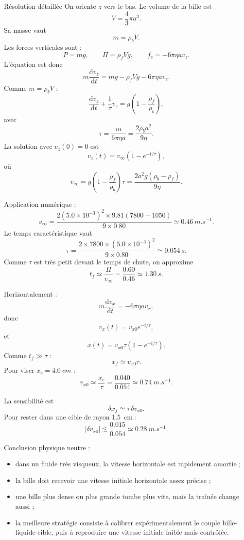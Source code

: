 \documentclass[11pt,a4paper]{article}
\newcommand{\der}[2]{\frac{\mathrm{d}#1}{\mathrm{d}#2}}
\begin{document}
\begin{correctionbox}{Résolution détaillée}{}
On oriente $z$ vers le bas. Le volume de la bille est
\[
V=\frac43\pi a^3.
\]
Sa masse vaut
\[
m=\rho_b V.
\]
Les forces verticales sont :
\[
P=mg,\qquad
\Pi=\rho_f Vg,\qquad
f_z=-6\pi\eta a v_z.
\]
L'équation est donc
\[
m\der{v_z}{t}=mg-\rho_fVg-6\pi\eta a v_z.
\]
Comme $m=\rho_bV$ :
\[
\der{v_z}{t}+\frac{1}{\tau}v_z
=
g\left(1-\frac{\rho_f}{\rho_b}\right),
\]
avec
\[
\tau=\frac{m}{6\pi\eta a}
=\frac{2\rho_ba^2}{9\eta}.
\]
La solution avec $v_z(0)=0$ est
\[
v_z(t)=v_\infty(1-e^{-t/\tau}),
\]
où
\[
v_\infty
=
g\left(1-\frac{\rho_f}{\rho_b}\right)\tau
=
\frac{2a^2g(\rho_b-\rho_f)}{9\eta}.
\]

Application numérique :
\[
v_\infty
=
\frac{2(5.0\times10^{-3})^2\times9.81(7800-1050)}
{9\times0.80}
\simeq \SI{0.46}{m.s^{-1}}.
\]
Le temps caractéristique vaut
\[
\tau=\frac{2\times7800\times(5.0\times10^{-3})^2}{9\times0.80}
\simeq \SI{0.054}{s}.
\]
Comme $\tau$ est très petit devant le temps de chute, on approxime
\[
t_f\simeq \frac{H}{v_\infty}
=\frac{0.60}{0.46}
\simeq \SI{1.30}{s}.
\]

Horizontalement :
\[
m\der{v_x}{t}=-6\pi\eta a v_x,
\]
donc
\[
v_x(t)=v_{x0}e^{-t/\tau},
\]
et
\[
x(t)=v_{x0}\tau(1-e^{-t/\tau}).
\]
Comme $t_f\gg \tau$ :
\[
x_f\simeq v_{x0}\tau.
\]
Pour viser $x_c=\SI{4.0}{cm}$ :
\[
v_{x0}\simeq \frac{x_c}{\tau}
=\frac{0.040}{0.054}
\simeq \SI{0.74}{m.s^{-1}}.
\]

La sensibilité est
\[
\delta x_f\simeq \tau\,\delta v_{x0}.
\]
Pour rester dans une cible de rayon \SI{1.5}{cm} :
\[
|\delta v_{x0}|\lesssim \frac{0.015}{0.054}
\simeq \SI{0.28}{m.s^{-1}}.
\]

Conclusion physique neutre :
\begin{itemize}
  \item dans un fluide très visqueux, la vitesse horizontale est rapidement amortie ;
  \item la bille doit recevoir une vitesse initiale horizontale assez précise ;
  \item une bille plus dense ou plus grande tombe plus vite, mais la traînée change aussi ;
  \item la meilleure stratégie consiste à calibrer expérimentalement le couple bille-liquide-cible, puis à reproduire une vitesse initiale faible mais contrôlée.
\end{itemize}
\end{correctionbox}

\begin{center}
\end{center}
\end{document}
